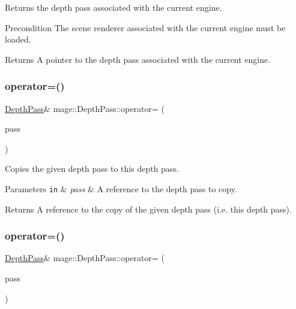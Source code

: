 Returns the depth pass associated with the current engine.

\begin{DoxyPrecond}{Precondition}
The scene renderer associated with the current engine must be loaded. 
\end{DoxyPrecond}
\begin{DoxyReturn}{Returns}
A pointer to the depth pass associated with the current engine. 
\end{DoxyReturn}
\hypertarget{classmage_1_1_depth_pass_aaa7e32c7850e992658398b59ab588a6b}{}\label{classmage_1_1_depth_pass_aaa7e32c7850e992658398b59ab588a6b} 
\subsubsection{\texorpdfstring{operator=()}{operator=()}\hspace{0.1cm}{\footnotesize\ttfamily [1/2]}}
{\footnotesize\ttfamily \hyperlink{classmage_1_1_depth_pass}{Depth\+Pass}\& mage\+::\+Depth\+Pass\+::operator= (\begin{DoxyParamCaption}\item[{const \hyperlink{classmage_1_1_depth_pass}{Depth\+Pass} \&}]{pass }\end{DoxyParamCaption})\hspace{0.3cm}{\ttfamily [delete]}}

Copies the given depth pass to this depth pass.


\begin{DoxyParams}[1]{Parameters}
\mbox{\tt in}  & {\em pass} & A reference to the depth pass to copy. \\
\hline
\end{DoxyParams}
\begin{DoxyReturn}{Returns}
A reference to the copy of the given depth pass (i.\+e. this depth pass). 
\end{DoxyReturn}
\hypertarget{classmage_1_1_depth_pass_a1ad4b122b6755e8f3c0073c92ddb29c1}{}\label{classmage_1_1_depth_pass_a1ad4b122b6755e8f3c0073c92ddb29c1} 
\subsubsection{\texorpdfstring{operator=()}{operator=()}\hspace{0.1cm}{\footnotesize\ttfamily [2/2]}}
{\footnotesize\ttfamily \hyperlink{classmage_1_1_depth_pass}{Depth\+Pass}\& mage\+::\+Depth\+Pass\+::operator= (\begin{DoxyParamCaption}\item[{\hyperlink{classmage_1_1_depth_pass}{Depth\+Pass} \&\&}]{pass }\end{DoxyParamCaption})\hspace{0.3cm}{\ttfamily [delete]}}

